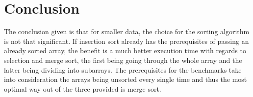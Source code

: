 \documentclass[a4paper,11pt]{article}
\begin{document}
\section*{Conclusion}
    
    The conclusion given is that for smaller data, the choice for the sorting algorithm is not that significant. If insertion sort already has the prerequisites of passing an already sorted array, the benefit is a much better execution time with regards to selection and merge sort, the first being going through the whole array and the latter being dividing into subarrays. The prerequisites for the benchmarks take into consideration the arrays being unsorted every single time and thus the most optimal way out of the three provided is merge sort. 
    
\end{document}

